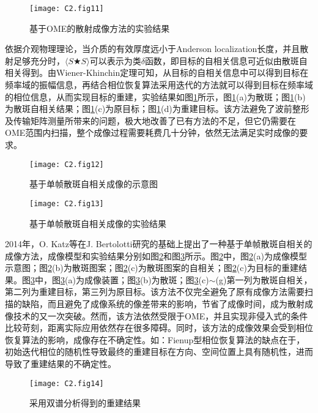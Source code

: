 \begin{figure}[htp]
	\centering
	\texttt{[image: C2.fig11]}
	\caption{基于OME的散射成像方法的实验结果}
	\label{fig2:11}
\end{figure}

依据介观物理理论\cite{akkermans_mesoscopic_2007,goodman_speckle_2007}，当介质的有效厚度远小于Anderson localization长度，并且散射足够充分时，$\langle S\bigstar S \rangle$可以表示为类$\delta$函数\cite{bertolotti_non-invasive_2012}，即目标的自相关信息可近似由散斑自相关得到。由Wiener-Khinchin定理可知，从目标的自相关信息中可以得到目标在频率域的振幅信息，再结合相位恢复算法采用迭代的方法就可以得到目标在频率域的相位信息，从而实现目标的重建，实验结果如图\ref{fig2:11}所示\cite{bertolotti_non-invasive_2012}，图\ref{fig2:11}(a)为散斑；图\ref{fig2:11}(b)为散斑自相关结果；图\ref{fig2:11}(c)为原目标；图\ref{fig2:11}(d)为重建目标。该方法避免了波前整形及传输矩阵测量所带来的问题，极大地改善了已有方法的不足，但它仍需要在OME范围内扫描，整个成像过程需要耗费几十分钟，依然无法满足实时成像的要求。


\begin{figure}[htp]
	\centering
	\texttt{[image: C2.fig12]}
	\caption{基于单帧散斑自相关成像的示意图}
	\label{fig2:12}
\end{figure}
\begin{figure}[htp]
	\centering
	\texttt{[image: C2.fig13]}
	\caption{基于单帧散斑自相关成像的实验结果}
	\label{fig2:13}
\end{figure}
2014年，O. Katz等\cite{katz_non-invasive_2014}在J. Bertolotti研究的基础上提出了一种基于单帧散斑自相关的成像方法，成像模型和实验结果分别如图\ref{fig2:12}和图\ref{fig2:13}所示\cite{katz_non-invasive_2014}。图\ref{fig2:12}中，图\ref{fig2:12}(a)为成像模型示意图；图\ref{fig2:12}(b)为散斑图案；图\ref{fig2:12}(c)为散斑图案的自相关；图\ref{fig2:12}(c)为目标的重建结果。图\ref{fig2:13}中，图\ref{fig2:13}(a)为成像装置；图\ref{fig2:13}(b)为散斑；图\ref{fig2:13}(c)$\sim$(g)第一列为散斑自相关，第二列为重建目标，第三列为原目标。该方法不仅完全避免了原有成像方法需要扫描的缺陷，而且避免了成像系统的像差带来的影响，节省了成像时间，成为散射成像技术的又一次突破。然而，该方法依然受限于OME，并且实现非侵入式的条件比较苛刻，距离实际应用依然存在很多障碍。同时，该方法的成像效果会受到相位恢复算法的影响，成像存在不确定性。如：Fienup型相位恢复算法\cite{fienup_phase_1982,fienup_reconstruction_1978}的缺点在于，初始迭代相位的随机性导致最终的重建目标在方向、空间位置上具有随机性，进而导致了重建结果的不确定性。

\begin{figure}[htp]
	\centering
	\texttt{[image: C2.fig14]}
	\caption{采用双谱分析得到的重建结果}
	\label{fig2:14}
\end{figure}

